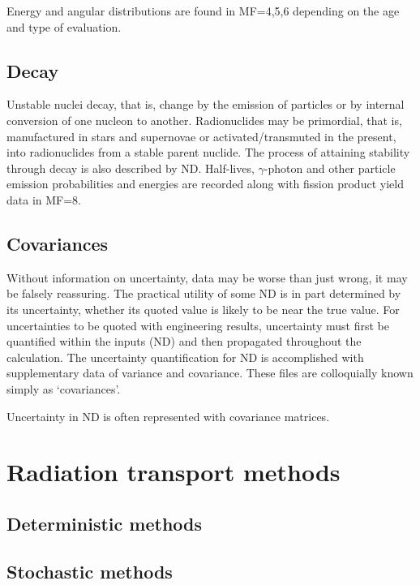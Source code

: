 Energy and angular distributions are found in MF=4,5,6 depending on the age and type of evaluation.

\subsection{Decay}
Unstable nuclei decay, that is, change by the emission of particles or by internal conversion of one nucleon to another. Radionuclides may be primordial, that is, manufactured in stars and supernovae or activated/transmuted in the present, into radionuclides from a stable parent nuclide. The process of attaining stability through decay is also described by ND. Half-lives, $\gamma$-photon and other particle emission probabilities and energies are recorded along with fission product yield data in MF=8. 

\subsection{Covariances}
Without information on uncertainty, data may be worse than just wrong, it may be falsely reassuring. The practical utility of some ND is in part determined by its uncertainty, whether its quoted value is likely to be near the true value. For uncertainties to be quoted with engineering results, uncertainty must first be quantified within the inputs (ND) and then propagated throughout the calculation. The uncertainty quantification for ND is accomplished with supplementary data of variance and covariance. These files are colloquially known simply as `covariances'. 

Uncertainty in ND is often represented with covariance matrices.

\section{Radiation transport methods}
\label{sec:radiation_transport}
\subsection{Deterministic methods}
\label{subsec:deterministic}
\subsection{Stochastic methods}
\label{subsec:monte_carlo}

